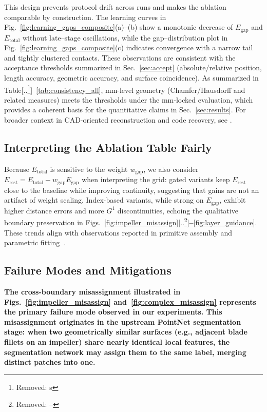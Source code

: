 \documentclass{ieeeaccess}
\providecommand{\DIFaddtex}[1]{{\color{blue}\bfseries #1}} %
\providecommand{\DIFdeltex}[1]{{\color{red}[..\footnote{\color{black}Removed: #1}]}} %
\providecommand{\DIFaddbegin}{} %
\providecommand{\DIFaddend}{} %
\providecommand{\DIFdelbegin}{} %
\providecommand{\DIFdelend}{} %
\providecommand{\DIFadd}[1]{\texorpdfstring{\DIFaddtex{#1}}{#1}} %
\providecommand{\DIFdel}[1]{\texorpdfstring{\DIFdeltex{#1}}{}} %
\begin{document}
This design prevents protocol drift across runs and makes the ablation
comparable by construction. The learning curves in
Fig.~\ref{fig:learning_gaps_composite}(a)–(b) show a monotonic decrease of
$E_{\text{gap}}$ and $E_{\text{total}}$ without late–stage oscillations,
while the gap–distribution plot in Fig.~\ref{fig:learning_gaps_composite}(c)
indicates convergence with a narrow tail and tightly clustered contacts.
These observations are consistent with the acceptance thresholds summarized in Sec.~\ref{sec:accept}
(absolute/relative position, length accuracy, geometric accuracy, and surface coincidence).
As summarized in Table\DIFdelbegin \DIFdel{s}\DIFdelend  ~\ref{tab:consistency_all}, mm-level geometry (Chamfer/Hausdorff and related measures) meets the thresholds
under the mm-locked evaluation, which provides a coherent basis for the quantitative claims in Sec.~\ref{sec:results}.
For broader context in CAD-oriented reconstruction and code recovery, see \cite{b2,b24}.


\subsection{Interpreting the Ablation Table Fairly}
Because $E_{\text{total}}$ is sensitive to the weight $w_{\text{gap}}$, we also consider
$E_{\text{rest}}=E_{\text{total}}-w_{\text{gap}}E_{\text{gap}}$ when interpreting the grid: gated
variants keep $E_{\text{rest}}$ close to the baseline while improving continuity,
suggesting that gains are not an artifact of weight scaling.
Index-based variants, while strong on $E_{\text{gap}}$, exhibit higher
distance errors and more $G^1$ discontinuities, echoing the
qualitative boundary preservation in Figs.~\ref{fig:impeller_misassign}\DIFdelbegin \DIFdel{–}\DIFdelend \DIFaddbegin \DIFadd{--}\DIFaddend \ref{fig:layer_guidance}. These trends align with observations reported in primitive assembly and parametric fitting\DIFaddbegin \DIFadd{~}\DIFaddend \cite{b14,b19}.

\DIFaddbegin \subsection{\DIFadd{Failure Modes and Mitigations}}
\label{sec:failure_modes}
\DIFadd{The cross-boundary misassignment illustrated in Figs.~\ref{fig:impeller_misassign} and~\ref{fig:complex_misassign} represents the primary failure mode observed in our experiments. This misassignment originates in the upstream PointNet segmentation stage: when two geometrically similar surfaces (e.g., adjacent blade fillets on an impeller) share nearly identical local features, the segmentation network may assign them to the same label, merging distinct patches into one.
}
\end{document}
